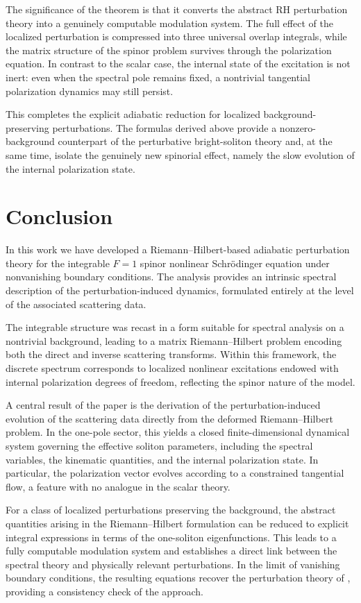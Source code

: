 \documentclass[11pt]{amsart}
\theoremstyle{definition}
\numberwithin{equation}{section}
\begin{document}
The significance of the theorem is that it converts the abstract RH perturbation theory into a genuinely computable modulation system. The full effect of the localized perturbation is compressed into three universal overlap integrals, while the matrix structure of the spinor problem survives through the polarization equation. In contrast to the scalar case, the internal state of the excitation is not inert: even when the spectral pole remains fixed, a nontrivial tangential polarization dynamics may still persist.

This completes the explicit adiabatic reduction for localized background-preserving perturbations. The formulas derived above provide a nonzero-background counterpart of the perturbative bright-soliton theory and, at the same time, isolate the genuinely new spinorial effect, namely the slow evolution of the internal polarization state.
\section{Conclusion}
\label{NVBC_spinor8}

In this work we have developed a Riemann--Hilbert-based adiabatic perturbation theory for the integrable $F=1$ spinor nonlinear Schr\"odinger equation under nonvanishing boundary conditions. The analysis provides an intrinsic spectral description of the perturbation-induced dynamics, formulated entirely at the level of the associated scattering data.

The integrable structure was recast in a form suitable for spectral analysis on a nontrivial background, leading to a matrix Riemann--Hilbert problem encoding both the direct and inverse scattering transforms. Within this framework, the discrete spectrum corresponds to localized nonlinear excitations endowed with internal polarization degrees of freedom, reflecting the spinor nature of the model.

A central result of the paper is the derivation of the perturbation-induced evolution of the scattering data directly from the deformed Riemann--Hilbert problem. In the one-pole sector, this yields a closed finite-dimensional dynamical system governing the effective soliton parameters, including the spectral variables, the kinematic quantities, and the internal polarization state. In particular, the polarization vector evolves according to a constrained tangential flow, a feature with no analogue in the scalar theory.

For a class of localized perturbations preserving the background, the abstract quantities arising in the Riemann--Hilbert formulation can be reduced to explicit integral expressions in terms of the one-soliton eigenfunctions. This leads to a fully computable modulation system and establishes a direct link between the spectral theory and physically relevant perturbations. In the limit of vanishing boundary conditions, the resulting equations recover the perturbation theory of \cite{Doktorov2008}, providing a consistency check of the approach.
\end{document}
